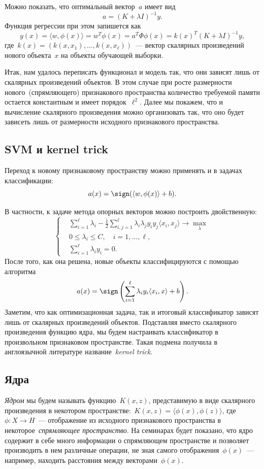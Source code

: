 \documentclass[12pt,fleqn]{article}
\begin{document}
Можно показать, что оптимальный вектор~$a$ имеет вид
\[
    a = (K + \lambda I)^{-1} y.
\]
Функция регрессии при этом запишется как
\[
    y(x)
    =
    \langle w, \phi(x) \rangle
    =
    w^T \phi(x)
    =
    a^T \Phi \phi(x)
    =
    k(x)^T (K + \lambda I)^{-1} y,
\]
где~$k(x) = (k(x, x_1), \dots, k(x, x_\ell))$~--- вектор скалярных произведений
нового объекта~$x$ на объекты обучающей выборки.

Итак, нам удалось переписать функционал и модель так, что они зависят лишь
от скалярных произведений объектов.
В этом случае при росте размерности нового~(спрямляющего) признакового пространства
количество требуемой памяти остается константным и имеет порядок~$\ell^2$.
Далее мы покажем, что и вычисление скалярного произведения
можно организовать так, что оно будет зависеть лишь от размерности
исходного признакового пространства.

\subsection{SVM и kernel trick}
Переход к новому признаковому пространству можно применять
и в задачах классификации:
\[
    a(x) = \sign ( \langle w, \phi(x) \rangle + b).
\]

В частности, к задаче метода опорных векторов можно построить двойственную:
\[
    \left\{
        \begin{aligned}
            & \sum_{i = 1}^{\ell}
                \lambda_i
            -
            \frac{1}{2} \sum_{i, j = 1}^{\ell}
                \lambda_i \lambda_j y_i y_j \langle x_i, x_j \rangle
            \to \max_{\lambda} \\
            & 0 \leq \lambda_i \leq C, \quad i = 1, \dots, \ell, \\
            & \sum_{i = 1}^{\ell} \lambda_i y_i = 0.
        \end{aligned}
    \right.
\]
После того, как она решена, новые объекты классифицируются
с помощью алгоритма
\[
    a(x) = \sign \left(
        \sum_{i = 1}^{\ell} \lambda_i y_i \langle x_i, x \rangle + b
    \right).
\]
Заметим, что как оптимизационная задача, так и итоговый классификатор
зависят лишь от скалярных произведений объектов.
Подставляя вместо скалярного произведения функцию ядра,
мы будем настраивать классификатор в произвольном признаковом пространстве.
Такая подмена получила в англоязычной литературе
название~\emph{kernel trick}.

\subsection{Ядра}
\emph{Ядром} мы будем называть функцию~$K(x, z)$,
представимую в виде скалярного произведения в некотором
пространстве:~$K(x, z) = \langle \phi(x), \phi(z) \rangle$,
где~$\phi: X \to H$~--- отображение из исходного признакового пространства
в некоторое~\emph{спрямляющее пространство}.
На семинарах будет показано, что ядро содержит в себе много информации о спрямляющем пространстве
и позволяет производить в нем различные операции, не зная самого
отображения~$\phi(x)$~--- например, находить расстояния между векторами~$\phi(x)$.
\end{document}
